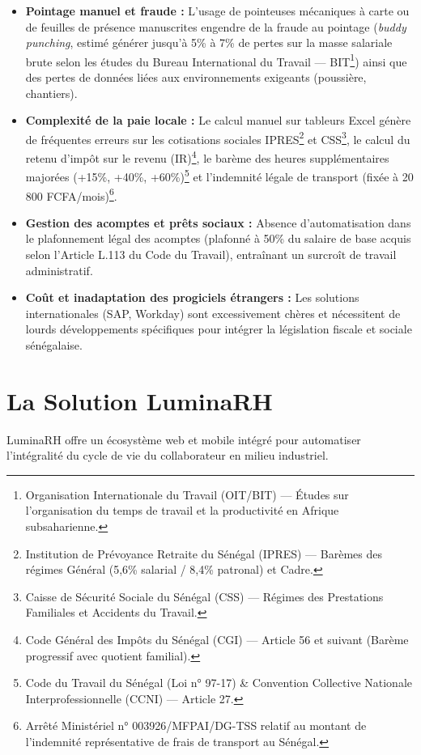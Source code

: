 \documentclass[11pt,a4paper]{article}
\begin{document}
\begin{itemize}[leftmargin=1.5em]
    \item \textbf{Pointage manuel et fraude :} L'usage de pointeuses mécaniques à carte ou de feuilles de présence manuscrites engendre de la fraude au pointage (\textit{buddy punching}, estimé générer jusqu'à 5\% à 7\% de pertes sur la masse salariale brute selon les études du Bureau International du Travail — BIT\footnote{Organisation Internationale du Travail (OIT/BIT) — Études sur l’organisation du temps de travail et la productivité en Afrique subsaharienne.}) ainsi que des pertes de données liées aux environnements exigeants (poussière, chantiers).
    \item \textbf{Complexité de la paie locale :} Le calcul manuel sur tableurs Excel génère de fréquentes erreurs sur les cotisations sociales IPRES\footnote{Institution de Prévoyance Retraite du Sénégal (IPRES) — Barèmes des régimes Général (5,6\% salarial / 8,4\% patronal) et Cadre.} et CSS\footnote{Caisse de Sécurité Sociale du Sénégal (CSS) — Régimes des Prestations Familiales et Accidents du Travail.}, le calcul du retenu d'impôt sur le revenu (IR)\footnote{Code Général des Impôts du Sénégal (CGI) — Article 56 et suivant (Barème progressif avec quotient familial).}, le barème des heures supplémentaires majorées (+15\%, +40\%, +60\%)\footnote{Code du Travail du Sénégal (Loi n° 97-17) \& Convention Collective Nationale Interprofessionnelle (CCNI) — Article 27.} et l'indemnité légale de transport (fixée à 20 800 FCFA/mois)\footnote{Arrêté Ministériel n° 003926/MFPAI/DG-TSS relatif au montant de l'indemnité représentative de frais de transport au Sénégal.}.
    \item \textbf{Gestion des acomptes et prêts sociaux :} Absence d'automatisation dans le plafonnement légal des acomptes (plafonné à 50\% du salaire de base acquis selon l'Article L.113 du Code du Travail), entraînant un surcroît de travail administratif.
    \item \textbf{Coût et inadaptation des progiciels étrangers :} Les solutions internationales (SAP, Workday) sont excessivement chères et nécessitent de lourds développements spécifiques pour intégrer la législation fiscale et sociale sénégalaise.
\end{itemize}

\section{La Solution LuminaRH}
LuminaRH offre un écosystème web et mobile intégré pour automatiser l'intégralité du cycle de vie du collaborateur en milieu industriel.
\end{document}
